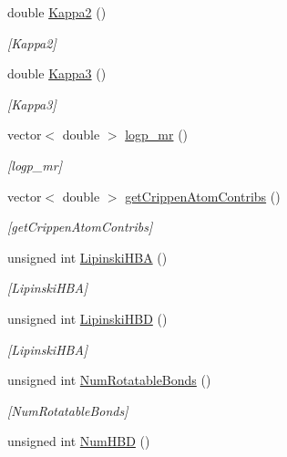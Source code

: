 \begin{DoxyCompactItemize}
double \mbox{\hyperlink{class_molecule_a27ded481f6abb14e5531e645713effe3}{Kappa2}} ()
\begin{DoxyCompactList}\small\item\em \mbox{[}Kappa2\mbox{]} \end{DoxyCompactList}\item 
double \mbox{\hyperlink{class_molecule_a46bf5206450f9a17bd2c256a7f37ab8b}{Kappa3}} ()
\begin{DoxyCompactList}\small\item\em \mbox{[}Kappa3\mbox{]} \end{DoxyCompactList}\item 
vector$<$ double $>$ \mbox{\hyperlink{class_molecule_ae3e5569d45cb96dbf1636d55e69273d4}{logp\+\_\+mr}} ()
\begin{DoxyCompactList}\small\item\em \mbox{[}logp\+\_\+mr\mbox{]} \end{DoxyCompactList}\item 
vector$<$ double $>$ \mbox{\hyperlink{class_molecule_a89046a3437790e24581fd2958d49c544}{get\+Crippen\+Atom\+Contribs}} ()
\begin{DoxyCompactList}\small\item\em \mbox{[}get\+Crippen\+Atom\+Contribs\mbox{]} \end{DoxyCompactList}\item 
unsigned int \mbox{\hyperlink{class_molecule_aae854241373a2539a0b9421b8d295dd6}{Lipinski\+H\+BA}} ()
\begin{DoxyCompactList}\small\item\em \mbox{[}Lipinski\+H\+BA\mbox{]} \end{DoxyCompactList}\item 
unsigned int \mbox{\hyperlink{class_molecule_a5b22fcdafd01813f7a554f42dad03aea}{Lipinski\+H\+BD}} ()
\begin{DoxyCompactList}\small\item\em \mbox{[}Lipinski\+H\+BA\mbox{]} \end{DoxyCompactList}\item 
unsigned int \mbox{\hyperlink{class_molecule_a1185b821c895d5bfd39d194570749524}{Num\+Rotatable\+Bonds}} ()
\begin{DoxyCompactList}\small\item\em \mbox{[}Num\+Rotatable\+Bonds\mbox{]} \end{DoxyCompactList}\item 
unsigned int \mbox{\hyperlink{class_molecule_a67cebe5aa58856c930fa1b162e592956}{Num\+H\+BD}} ()

\end{DoxyCompactItemize}
